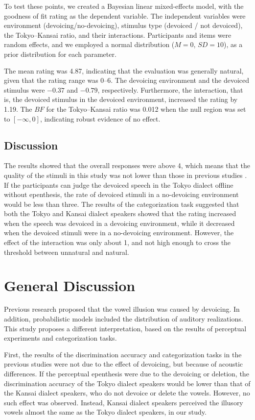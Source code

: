 \documentclass[a4paper,11pt,twocolumn]{article}
\begin{document}
To test these points, we created a Bayesian linear mixed-effects model, with the goodness of fit rating as the dependent variable. The independent variables were environment (devoicing/no-devoicing), stimulus type (devoiced / not devoiced), the Tokyo--Kansai ratio, and their interactions. Participants and items were random effects, and we employed a normal distribution ($M=0$, $SD=10$), as a prior distribution for each parameter.

The mean rating was 4.87, indicating that the evaluation was generally natural, given that the rating range was 0--6. The devoicing environment and the devoiced stimulus were $-0.37$ and $-0.79$, respectively. Furthermore, the interaction, that is, the devoiced stimulus in the devoiced environment, increased the rating by 1.19. The $BF$ for the Tokyo--Kansai ratio was 0.012 when the null region was set to $[-\infty, 0]$, indicating robust evidence of no effect.

\subsection{Discussion}

The results showed that the overall responses were above 4, which means that the quality of the stimuli in this study was not lower than those in previous studies \cite{kilpatrick2018japanese}. If the participants can judge the devoiced speech in the Tokyo dialect offline without epenthesis, the rate of devoiced stimuli in a no-devoicing environment would be less than three. The results of the categorization task suggested that both the Tokyo and Kansai dialect speakers showed that the rating increased when the speech was devoiced in a devoicing environment, while it decreased when the devoiced stimuli were in a no-devoicing environment. However, the effect of the interaction was only about 1, and not high enough to cross the threshold between unnatural and natural.

\section{General Discussion}

Previous research proposed that the vowel illusion was caused by devoicing. In addition, probabilistic models included the distribution of auditory realizations. This study proposes a different interpretation, based on the results of perceptual experiments and categorization tasks.

First, the results of the discrimination accuracy and categorization tasks in the previous studies were not due to the effect of devoicing, but because of acoustic differences. If the perceptual epenthesis were due to the devoicing or deletion, the discrimination accuracy of the Tokyo dialect speakers would be lower than that of the Kansai dialect speakers, who do not devoice or delete the vowels. However, no such effect was observed. Instead, Kansai dialect speakers perceived the illusory vowels almost the same as the Tokyo dialect speakers, in our study.
\end{document}
